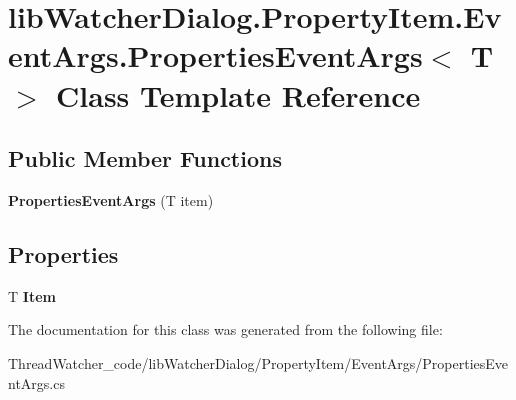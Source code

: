 \hypertarget{classlib_watcher_dialog_1_1_property_item_1_1_event_args_1_1_properties_event_args_3_01_t_01_4}{\section{lib\+Watcher\+Dialog.\+Property\+Item.\+Event\+Args.\+Properties\+Event\+Args$<$ T $>$ Class Template Reference}
\label{classlib_watcher_dialog_1_1_property_item_1_1_event_args_1_1_properties_event_args_3_01_t_01_4}
}
\subsection*{Public Member Functions}
\begin{DoxyCompactItemize}
\item 
\hypertarget{classlib_watcher_dialog_1_1_property_item_1_1_event_args_1_1_properties_event_args_3_01_t_01_4_adb89a533d490fae9dbdbe5a9cac615f0}{{\bfseries Properties\+Event\+Args} (T item)}\label{classlib_watcher_dialog_1_1_property_item_1_1_event_args_1_1_properties_event_args_3_01_t_01_4_adb89a533d490fae9dbdbe5a9cac615f0}

\end{DoxyCompactItemize}
\subsection*{Properties}
\begin{DoxyCompactItemize}
\item 
\hypertarget{classlib_watcher_dialog_1_1_property_item_1_1_event_args_1_1_properties_event_args_3_01_t_01_4_a62119fae9dc5650c77c1cc2d4edcd32f}{T {\bfseries Item}}\label{classlib_watcher_dialog_1_1_property_item_1_1_event_args_1_1_properties_event_args_3_01_t_01_4_a62119fae9dc5650c77c1cc2d4edcd32f}

\end{DoxyCompactItemize}


The documentation for this class was generated from the following file\+:\begin{DoxyCompactItemize}
\item 
Thread\+Watcher\+\_\+code/lib\+Watcher\+Dialog/\+Property\+Item/\+Event\+Args/Properties\+Event\+Args.\+cs\end{DoxyCompactItemize}
